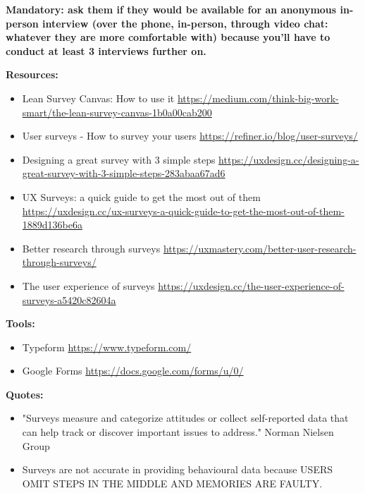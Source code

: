 \textbf{Mandatory: ask them if they would be available for an anonymous in-person interview (over the phone, in-person, through video chat: whatever they are more comfortable with) because you'll have to conduct at least 3 interviews further on.}

\textbf{Resources:}

\begin{itemize}
\item Lean Survey Canvas: How to use it \url{https://medium.com/think-big-work-smart/the-lean-survey-canvas-1b0a00cab200}
\item User surveys - How to survey your users \url{https://refiner.io/blog/user-surveys/}
\item Designing a great survey with 3 simple steps \url{https://uxdesign.cc/designing-a-great-survey-with-3-simple-steps-283abaa67ad6}
\item UX Surveys: a quick guide to get the most out of them \url{https://uxdesign.cc/ux-surveys-a-quick-guide-to-get-the-most-out-of-them-1889d136be6a}
\item Better research through surveys \url{https://uxmastery.com/better-user-research-through-surveys/}
\item The user experience of surveys \url{https://uxdesign.cc/the-user-experience-of-surveys-a5420c82604a}
\end{itemize}

\textbf{Tools:}

\begin{itemize}
\item Typeform \url{https://www.typeform.com/}
\item Google Forms \url{https://docs.google.com/forms/u/0/}
\end{itemize}

\textbf{Quotes:}

\begin{itemize}
\item "Surveys measure and categorize attitudes or collect self-reported data that can help track or discover important issues to address." Norman Nielsen Group
\item Surveys are not accurate in providing behavioural data because USERS OMIT STEPS IN THE MIDDLE AND MEMORIES ARE FAULTY.
\end{itemize}

